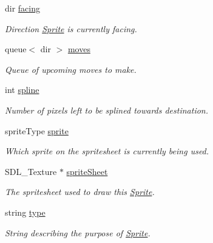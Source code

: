 \begin{DoxyCompactItemize}
\item 
dir \hyperlink{class_sprite_a40357a4e61f454decf1970929e9d2d0c}{facing}\hypertarget{class_sprite_a40357a4e61f454decf1970929e9d2d0c}{}\label{class_sprite_a40357a4e61f454decf1970929e9d2d0c}

\begin{DoxyCompactList}\small\item\em Direction \hyperlink{class_sprite}{Sprite} is currently facing. \end{DoxyCompactList}\item 
queue$<$ dir $>$ \hyperlink{class_sprite_a2ef470094b583e087a71779632aaefb6}{moves}\hypertarget{class_sprite_a2ef470094b583e087a71779632aaefb6}{}\label{class_sprite_a2ef470094b583e087a71779632aaefb6}

\begin{DoxyCompactList}\small\item\em Queue of upcoming moves to make. \end{DoxyCompactList}\item 
int \hyperlink{class_sprite_aa3a18aaf97a12edfced1b31f2323ae01}{spline}\hypertarget{class_sprite_aa3a18aaf97a12edfced1b31f2323ae01}{}\label{class_sprite_aa3a18aaf97a12edfced1b31f2323ae01}

\begin{DoxyCompactList}\small\item\em Number of pixels left to be splined towards destination. \end{DoxyCompactList}\item 
sprite\+Type \hyperlink{class_sprite_afbd06de3c7cace1c741bbb609abfa119}{sprite}\hypertarget{class_sprite_afbd06de3c7cace1c741bbb609abfa119}{}\label{class_sprite_afbd06de3c7cace1c741bbb609abfa119}

\begin{DoxyCompactList}\small\item\em Which sprite on the spritesheet is currently being used. \end{DoxyCompactList}\item 
S\+D\+L\+\_\+\+Texture $\ast$ \hyperlink{class_sprite_aec7102885a3ca3fdd5124f8677135013}{sprite\+Sheet}\hypertarget{class_sprite_aec7102885a3ca3fdd5124f8677135013}{}\label{class_sprite_aec7102885a3ca3fdd5124f8677135013}

\begin{DoxyCompactList}\small\item\em The spritesheet used to draw this \hyperlink{class_sprite}{Sprite}. \end{DoxyCompactList}\item 
string \hyperlink{class_sprite_af4ab6cfa8155326b6d8af31f943514f2}{type}\hypertarget{class_sprite_af4ab6cfa8155326b6d8af31f943514f2}{}\label{class_sprite_af4ab6cfa8155326b6d8af31f943514f2}

\begin{DoxyCompactList}\small\item\em String describing the purpose of \hyperlink{class_sprite}{Sprite}. \end{DoxyCompactList}\end{DoxyCompactItemize}


